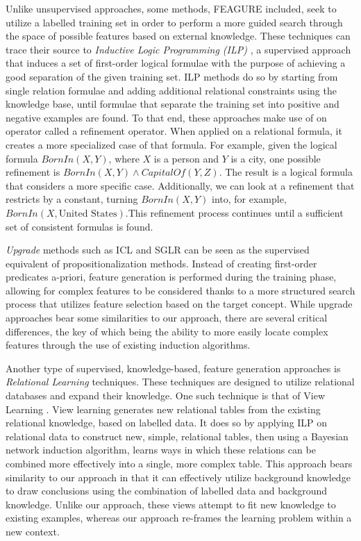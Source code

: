 \documentclass[twoside,11pt]{article}
\theoremstyle{definition}
\begin{document}
Unlike unsupervised approaches, some methods, FEAGURE included, seek to utilize a labelled training set in order to perform a more guided search through the space of possible features based on external knowledge. 
These techniques can trace their source to \emph{Inductive Logic Programming (ILP)} \cite{quinlan1990learning,muggleton1991inductive}, a supervised approach that induces a set of first-order logical formulae with the purpose of achieving a good separation of the given training set. ILP methods do so by starting from single relation formulae and adding additional relational constraints using the knowledge base, until formulae that separate the training set into positive and negative examples are found. To that end, these approaches make use of on operator called a refinement operator. When applied on a relational formula, it creates a more specialized case of that formula. For example, given the logical formula $BornIn(X,Y)$, where $X$ is a person and $Y$ is a city, one possible refinement is $BornIn(X,Y)\land CapitalOf(Y,Z)$. The result is a logical formula that considers a more specific case. Additionally, we can look at a refinement that restricts by a constant, turning $BornIn(X,Y)$ into, for example, $BornIn(X, \mbox{{United States}})$.This refinement process continues until a sufficient set of consistent formulas is found.

 \emph{Upgrade} methods such as ICL \cite{van2001upgrade} and SGLR \cite{popescul200716} can be seen as the supervised equivalent of propositionalization methods. Instead of creating first-order predicates a-priori, feature generation is performed during the training phase, allowing for complex features to be considered thanks to a more structured search process that utilizes feature selection based on the target concept.
 While upgrade approaches bear some similarities to our approach, there are several critical differences, the key of which being the ability to more easily locate complex features through the use of existing induction algorithms. 

Another type of supervised, knowledge-based, feature generation approaches is \emph{Relational Learning} techniques. These techniques are designed to utilize relational databases and expand their knowledge. One such technique is that of View Learning . View learning generates new relational tables from the existing relational knowledge, based on labelled data.
It does so by applying ILP on relational data to construct new, simple, relational tables, then using a Bayesian network induction algorithm, learns ways in which these relations can be combined more effectively into a single, more complex table.
This approach bears similarity to our approach in that it can effectively utilize background knowledge to draw conclusions using the combination of labelled data and background knowledge. Unlike our approach, these views attempt to fit new knowledge to existing examples, whereas our approach re-frames the learning problem within a new context.
\end{document}
